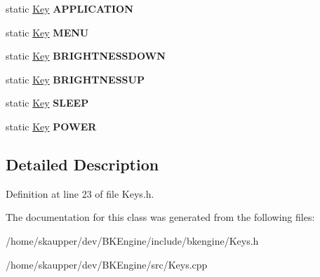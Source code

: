 \begin{DoxyCompactItemize}
\item 
\mbox{\label{classbkengine_1_1Keys_aa0e40ff0a1d47cc6b43df691d7f700fb}} 
static \hyperlink{classbkengine_1_1Key}{Key} {\bfseries A\+P\+P\+L\+I\+C\+A\+T\+I\+ON}
\item 
\mbox{\label{classbkengine_1_1Keys_a10569da98037bc221ec5abcf608d42ab}} 
static \hyperlink{classbkengine_1_1Key}{Key} {\bfseries M\+E\+NU}
\item 
\mbox{\label{classbkengine_1_1Keys_a650255dfa14749e0d54b5a3421bd2d38}} 
static \hyperlink{classbkengine_1_1Key}{Key} {\bfseries B\+R\+I\+G\+H\+T\+N\+E\+S\+S\+D\+O\+WN}
\item 
\mbox{\label{classbkengine_1_1Keys_a6679013407bbd4ab43bbdf5fb8cbd89f}} 
static \hyperlink{classbkengine_1_1Key}{Key} {\bfseries B\+R\+I\+G\+H\+T\+N\+E\+S\+S\+UP}
\item 
\mbox{\label{classbkengine_1_1Keys_ad0c2c3f8167fed85a78880df78586668}} 
static \hyperlink{classbkengine_1_1Key}{Key} {\bfseries S\+L\+E\+EP}
\item 
\mbox{\label{classbkengine_1_1Keys_a56a092820f30ff13ac645c59d22c6f0b}} 
static \hyperlink{classbkengine_1_1Key}{Key} {\bfseries P\+O\+W\+ER}
\end{DoxyCompactItemize}


\subsection{Detailed Description}


Definition at line 23 of file Keys.\+h.



The documentation for this class was generated from the following files\+:\begin{DoxyCompactItemize}
\item 
/home/skaupper/dev/\+B\+K\+Engine/include/bkengine/Keys.\+h\item 
/home/skaupper/dev/\+B\+K\+Engine/src/Keys.\+cpp\end{DoxyCompactItemize}
